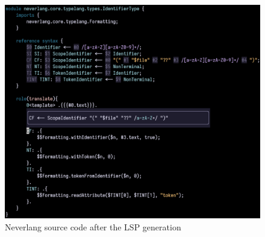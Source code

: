 \begin{figure}[h!]
\begin{minipage}{0.45\textwidth}
        \includegraphics[width=\linewidth]{./imgs/neverlang-lsp-after-vim.png}
        \caption{Neverlang source code after the LSP generation}
    \end{minipage}
    \label{fig:neverlang-lsp-before-after}
\end{figure}



